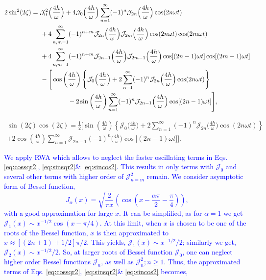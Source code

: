 \documentclass[12pt]{iopart}
\newcommand{\blue}[1]{\textcolor{blue}{#1}}
\begin{document}
\begin{align}
2\sin^2(2\zeta)
&= \mathcal{J}^2_0\Big(\frac{4h}{\omega}\Big) + 4\mathcal{J}_0\Big(\frac{4h}{\omega}\Big)\sum_{n=1}^\infty (-1)^n \mathcal{J}_{2n}\Big(\frac{4h}{\omega}\Big)\cos(2n\omega t)\nonumber\\
&\hspace{0.5cm}+4\sum_{n,m=1}^\infty(-1)^{n+m}\mathcal{J}_{2n}\Big(\frac{4h}{\omega}\Big)\mathcal{J}_{2m}\Big(\frac{4h}{\omega}\Big) \cos(2n\omega t)\cos(2m\omega t)\nonumber\\
&\hspace{0.5cm}+4 \sum_{n,m=1}^\infty (-1)^{n+m} \mathcal{J}_{2n-1}\Big(\frac{4h}{\omega}\Big)\mathcal{J}_{2m-1}\Big(\frac{4h}{\omega}\Big)\cos[(2n-1)\omega t]\cos[(2m-1)\omega t]\nonumber\\
&\hspace{0.5cm}-\Bigg[\cos\left(\frac{4h}{\omega}\right)\left\{\mathcal{J}_0\Big(\frac{4h}{\omega}\Big) + 2 \sum_{n=1}^\infty (-1)^n \mathcal{J}_{2n}\Big(\frac{4h}{\omega}\Big)\cos(2n\omega t)\right\}\nonumber\\
&\hspace{2.0cm}-2\sin\left(\frac{4h}{\omega}\right) \sum_{n=1}^\infty(-1)^n \mathcal{J}_{2n-1}\Big(\frac{4h}{\omega}\Big)\cos[(2n-1)\omega t]\Bigg],
\label{eq:sinsqr2}
\end{align}

\begin{multline}
\sin(2\zeta) \cos(2\zeta) = \frac12 \Bigg[\sin\left(\frac{4h}{\omega}\right)\left\{\mathcal{J}_0\Big(\frac{4h}{\omega}\Big) + 2 \sum_{n=1}^\infty (-1)^n \mathcal{J}_{2n}\Big(\frac{4h}{\omega}\Big)\cos(2n\omega t)\right\}\\+2\cos\left(\frac{4h}{\omega}\right)\sum_{n=1}^\infty \mathcal{J}_{2n-1}(-1)^n\Big(\frac{4h}{\omega}\Big)\cos\big[(2n-1)\omega t]\Bigg].
\label{eq:sincos2}
\end{multline}

\blue{
We apply RWA which allows to neglect the faster oscillating terms in Eqs. \eqref{eq:cossqr2}, \eqref{eq:sinsqr2}\& \eqref{eq:sincos2}. This results in only terms with $\mathcal{J}_0$ and several other terms with higher order of $\mathcal{J}^2_{n=m}$ remain. We consider asymptotic form of Bessel function,
\begin{equation*}
	J_\alpha(x)=\sqrt{\frac{2}{\pi x}}\left(\cos \left(x-\frac{\alpha \pi}{2}-\frac{\pi}{4}\right)\right),
\end{equation*}
with a good approximation for large $x$. It can be simplified, as for  $\alpha=1$ we get $\mathcal{J}_1(x) \sim x^{-1 / 2} \cos (x-\pi / 4)$. At this limit, when $x$ is chosen to be one of the roots of the Bessel function, $x$ is then approximated to $x\approx [(2n+1)+1/2]\pi/2$. This yields, $\mathcal{J}_1(x)\sim x^{-1/2}/2$; similarly we get, $\mathcal{J}_2(x)\sim x^{-1/2}/2$. So, at larger roots of Bessel function $\mathcal{J}_0$, one can neglect higher order Bessel functions $\mathcal{J}_n$, as well as $\mathcal{J}^2_n; n\ge 1$.  Thus, the approximated terms of Eqs. \eqref{eq:cossqr2}, \eqref{eq:sinsqr2}\& \eqref{eq:sincos2} becomes,}
\end{document}

